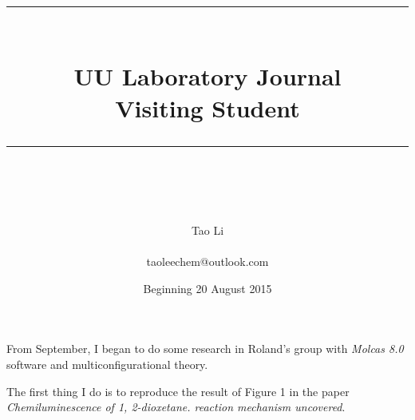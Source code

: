 \documentclass[idxtotoc,hyperref,openany]{labbook} %
\newcommand{\HRule}{\rule{\linewidth}{0.5mm}} %
\begin{document}

\frontmatter %
\title{
\begin{center}
\HRule \\[0.4cm]
{\Huge \bfseries UU Laboratory Journal \\[0.5cm] \Large Visiting Student}\\[0.4cm] %
\HRule \\[1.5cm]
\end{center}
}
\author{\Huge Tao Li \\ \\ \LARGE taoleechem@outlook.com \\[2cm]} %
\date{Beginning 20 August 2015} %
\maketitle

\tableofcontents

\mainmatter %











From September, I began to do some research in Roland's group with \textit{Molcas 8.0} software and multiconfigurational theory.\par

The first thing I do is to reproduce the result of Figure 1 in the paper \textit{Chemiluminescence of 1, 2-dioxetane. reaction mechanism uncovered}.\cite{de2007chemiluminescence}\par 
\end{document}
